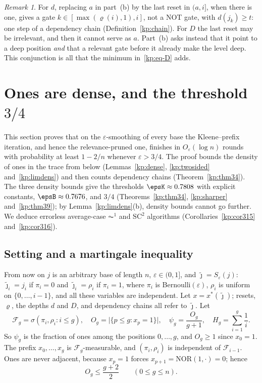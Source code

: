 \documentclass[11pt]{amsart}
\theoremstyle{definition}
\theoremstyle{remark}
\newtheorem{remark}[theorem]{Remark}
\newcommand{\eps}{\varepsilon}
\newcommand{\jt}{\tilde{\jmath}}
\newcommand{\NOR}{\mathrm{NOR}}
\newcommand{\cF}{\mathcal{F}}
\begin{document}
\begin{remark}\label{kp:rem-switch}
For $d$, replacing $a$ in part~(b) by the last reset in $(a,i]$, when there is
one, gives a gate $k\in[\max(\varrho(i),1),i]$, not a NOT gate, with
$d(j_k)\ge t$: one step of a dependency chain (Definition~\ref{kp:chain}). For
$D$ the last reset may be irrelevant, and then it cannot serve as $a$. Part~(b)
asks instead that it point to a deep position \emph{and} that a relevant gate
before it already make the level deep. This conjunction is all that the
minimum in~\eqref{kp:eq-D} adds.
\end{remark}


\section{Ones are dense, and the threshold \texorpdfstring{$3/4$}{3/4}}\label{sec:dense}

This section proves that on the $\eps$-smoothing of every base the
Kleene--prefix iteration, and hence the relevance-pruned one, finishes in
$O_\eps(\log n)$ rounds with probability at least $1-2/n$ whenever
$\eps>3/4$. The proof bounds the density of ones in the trace from below
(Lemmas~\ref{kp:dense}, \ref{kp:twosided} and~\ref{kp:limdens}) and then counts
dependency chains (Theorem~\ref{kp:thm34}). The three density bounds give the
thresholds $\epsK\approx 0.7808$ with explicit constants, $\epsB\approx 0.7676$,
and $3/4$ (Theorems~\ref{kp:thm34}, \ref{kp:sharper} and~\ref{kp:thm39}); by
Lemma~\ref{kp:limdens}(b), density bounds cannot go further. We deduce
errorless average-case $\AC^1$ and $\mathrm{SC}^2$ algorithms
(Corollaries~\ref{kp:cor315} and~\ref{kp:cor316}).

\subsection{Setting and a martingale inequality}\label{kp:sub-setting}

From now on $j$ is an arbitrary base of length $n$, $\eps\in(0,1]$, and
$\jt=S_\eps(j)$: $\jt_i=j_i$ if $\pi_i=0$ and $\jt_i=\rho_i$ if $\pi_i=1$, where
$\pi_i$ is Bernoulli$(\eps)$, $\rho_i$ is uniform on $\{0,\dots,i-1\}$, and all
these variables are independent. Let $x=x^*(\jt)$; resets, $\varrho$, the depths
$d$ and $D$, and dependency chains all refer to $\jt$. Let
\[
  \cF_g=\sigma(\pi_i,\rho_i: i\le g),\quad
  O_g=\bigl|\{p\le g: x_p=1\}\bigr|,\quad
  \psi_g=\frac{O_g}{g+1},\quad H_g=\sum_{i=1}^{g}\frac1i .
\]
So $\psi_g$ is the fraction of ones among the positions $0,\dots,g$, and
$O_g\ge 1$ since $x_0=1$. The prefix $x_0,\dots,x_{g}$ is
$\cF_{g}$-measurable, and $(\pi_i,\rho_i)$ is independent of $\cF_{i-1}$.
Ones are never adjacent, because $x_p=1$ forces $x_{p+1}=\NOR(1,\cdot)=0$;
hence
\begin{equation}\label{kp:eq-nonadj}
  O_g\le\frac{g+2}{2}\qquad(0\le g\le n).
\end{equation}
\end{document}
